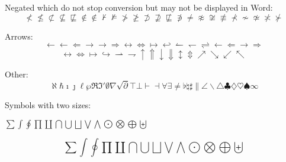 Negated which do not stop conversion but may not be displayed in Word:
\begin{dmath}[compact,spread={1.250000\baselineskip}] \not< \not\leq \not\subset \not\subseteq \not\sqsubseteq \not\in \notin \not\vdash \not\models \not> \not\geq \not\supset \not\supseteq \not\sqsubseteq \not\ni \not= \not\approx \not\cong \not\equiv \not\prec \not\sim \not\simeq \not\asymp \not\succ  \end{dmath}


Arrows:
\begin{dmath}[compact,spread={1.250000\baselineskip}] \leftarrow \gets \Leftarrow \rightarrow \to \Rightarrow \leftrightarrow \Leftrightarrow \mapsto \hookleftarrow \leftharpoonup \leftharpoondown \rightleftharpoons \longleftarrow \Longleftarrow \longrightarrow \Longrightarrow  \end{dmath}
\begin{dmath}[compact,spread={1.250000\baselineskip}] \longleftrightarrow \Longleftrightarrow \longmapsto \hookrightarrow \rightharpoonup \rightharpoondown \uparrow \Uparrow \downarrow \Downarrow \updownarrow \Updownarrow \nearrow \searrow \swarrow \nwarrow \end{dmath}

Other:
\begin{dmath}[compact,spread={1.250000\baselineskip}] \aleph \hbar \imath \jmath \ell \wp \Re \Im \prime \emptyset \nabla \surd \partial \top \bot \vdash \dashv \forall \exists \neq \flat \natural \sharp \| \angle \backslash \triangle \clubsuit \diamondsuit \heartsuit \spadesuit \infty \end{dmath}

Symbols with two sizes: 
\begin{center}
\(\sum \int \oint \prod \coprod \bigcap \bigcup \bigsqcup \bigvee \bigwedge \bigodot \bigotimes \bigoplus \biguplus\)
\end{center}
\begin{dmath}[compact,spread={1.250000\baselineskip}] \sum \int \oint \prod \coprod \bigcap \bigcup \bigsqcup \bigvee \bigwedge \bigodot \bigotimes \bigoplus \biguplus \end{dmath}

